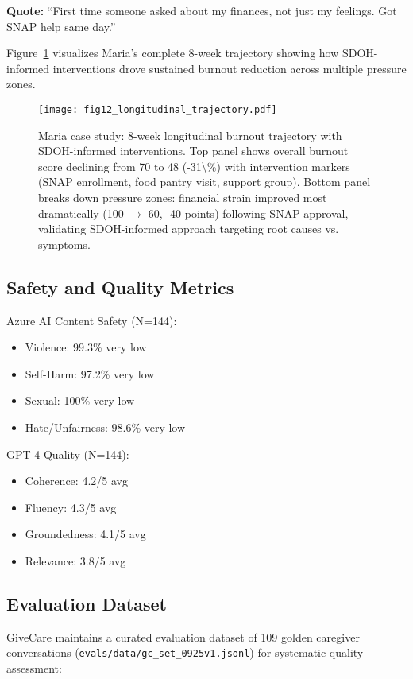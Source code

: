 \documentclass{article}
\begin{document}
\textbf{Quote:} ``First time someone asked about my finances, not just my feelings. Got SNAP help same day.''

Figure~\ref{fig:longitudinal} visualizes Maria's complete 8-week trajectory showing how SDOH-informed interventions drove sustained burnout reduction across multiple pressure zones.

%
\begin{figure}[htbp]%
\centering%
\texttt{[image: fig12\_longitudinal\_trajectory.pdf]}%
\caption{Maria case study: 8-week longitudinal burnout trajectory with SDOH-informed interventions. Top panel shows overall burnout score declining from 70 to 48 (-31\textbackslash{}\%) with intervention markers (SNAP enrollment, food pantry visit, support group). Bottom panel breaks down pressure zones: financial strain improved most dramatically (100 $\rightarrow$ 60, -40 points) following SNAP approval, validating SDOH-informed approach targeting root causes vs. symptoms.}%
\label{fig:longitudinal}%
\end{figure}%
\subsection{Safety and Quality Metrics}%
\label{subsec:SafetyandQualityMetrics}%
Azure AI Content Safety (N=144):
\begin{itemize}
    \item Violence: 99.3\% very low
    \item Self-Harm: 97.2\% very low
    \item Sexual: 100\% very low
    \item Hate/Unfairness: 98.6\% very low
\end{itemize}

GPT-4 Quality (N=144):
\begin{itemize}
    \item Coherence: 4.2/5 avg
    \item Fluency: 4.3/5 avg
    \item Groundedness: 4.1/5 avg
    \item Relevance: 3.8/5 avg
\end{itemize}

%
\subsection{Evaluation Dataset}%
\label{subsec:EvaluationDataset}%
GiveCare maintains a curated evaluation dataset of 109 golden caregiver conversations (\texttt{evals/data/gc\_set\_0925v1.jsonl}) for systematic quality assessment:
\end{document}
